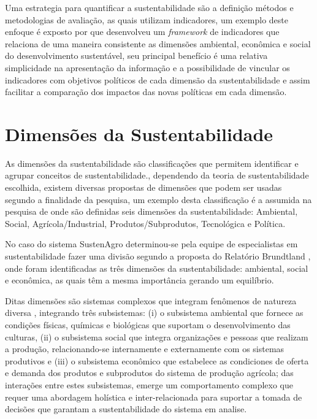 Uma estrategia para quantificar a sustentabilidade são a definição
métodos e metodologias de avaliação, as quais utilizam indicadores,
um exemplo deste enfoque é exposto por \citet{AlkanOlsson:2009} que
desenvolveu um \foreignlanguage{english}{\emph{framework}} de indicadores
que relaciona de uma maneira consistente as dimensões ambiental, econômica
e social do desenvolvimento sustentável, seu principal benefício é
uma relativa simplicidade na apresentação da informação e a possibilidade
de vincular os indicadores com objetivos políticos de cada dimensão
da sustentabilidade e assim facilitar a comparação dos impactos das
novas políticas em cada dimensão.

\section{Dimensões da Sustentabilidade}

As dimensões da sustentabilidade são classificações que permitem identificar
e agrupar conceitos de sustentabilidade\citep{AlkanOlsson:2009}.,
dependendo da teoria de sustentabilidade escolhida, existem diversas
propostas de dimensões que podem ser usadas segundo a finalidade da
pesquisa, um exemplo desta classificação é a assumida na pesquisa
de \citet{oliveira:2013} onde são definidas seis dimensões da sustentabilidade:
Ambiental, Social, Agrícola/Industrial, Produtos/Subprodutos, Tecnológica
e Política.

No caso do sistema SustenAgro determinou-se pela equipe de especialistas
em sustentabilidade fazer uma divisão segundo a proposta do Relatório
Brundtland \citep{brundtland1987our}, onde foram identificadas as
três dimensões da sustentabilidade: ambiental, social e econômica,
as quais têm a mesma importância gerando um equilíbrio.

Ditas dimensões são sistemas complexos que integram fenômenos de natureza
diversa \citep{simon1991architecture}, integrando três subsistemas:
(i) o subsistema ambiental que fornece as condições físicas, químicas
e biológicas que suportam o desenvolvimento das culturas, (ii) o subsistema
social que integra organizações e pessoas que realizam a produção,
relacionando-se internamente e externamente com os sistemas produtivos
e (iii) o subsistema econômico que estabelece as condiciones de oferta
e demanda dos produtos e subprodutos do sistema de produção agrícola;
das interações entre estes subsistemas, emerge um comportamento complexo
que requer uma abordagem holística e inter-relacionada para suportar
a tomada de decisões que garantam a sustentabilidade do sistema em
analise.

